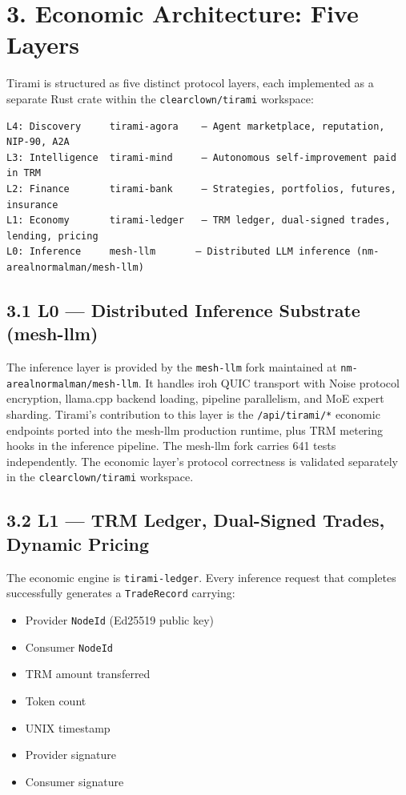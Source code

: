 \documentclass[
  11pt,
]{article}
\providecommand{\tightlist}{%
  \setlength{\itemsep}{0pt}\setlength{\parskip}{0pt}}
\begin{document}
\section{3. Economic Architecture: Five
Layers}\label{economic-architecture-five-layers}

Tirami is structured as five distinct protocol layers, each implemented
as a separate Rust crate within the \texttt{clearclown/tirami}
workspace:

\begin{verbatim}
L4: Discovery     tirami-agora    — Agent marketplace, reputation, NIP-90, A2A
L3: Intelligence  tirami-mind     — Autonomous self-improvement paid in TRM
L2: Finance       tirami-bank     — Strategies, portfolios, futures, insurance
L1: Economy       tirami-ledger   — TRM ledger, dual-signed trades, lending, pricing
L0: Inference     mesh-llm       — Distributed LLM inference (nm-arealnormalman/mesh-llm)
\end{verbatim}

\subsection{3.1 L0 --- Distributed Inference Substrate
(mesh-llm)}\label{l0-distributed-inference-substrate-mesh-llm}

The inference layer is provided by the \texttt{mesh-llm} fork maintained
at \texttt{nm-arealnormalman/mesh-llm}. It handles iroh QUIC transport
with Noise protocol encryption, llama.cpp backend loading, pipeline
parallelism, and MoE expert sharding. Tirami's contribution to this
layer is the \texttt{/api/tirami/*} economic endpoints ported into the
mesh-llm production runtime, plus TRM metering hooks in the inference
pipeline. The mesh-llm fork carries 641 tests independently. The
economic layer's protocol correctness is validated separately in the
\texttt{clearclown/tirami} workspace.

\subsection{3.2 L1 --- TRM Ledger, Dual-Signed Trades, Dynamic
Pricing}\label{l1-trm-ledger-dual-signed-trades-dynamic-pricing}

The economic engine is \texttt{tirami-ledger}. Every inference request
that completes successfully generates a \texttt{TradeRecord} carrying:

\begin{itemize}
\tightlist
\item
  Provider \texttt{NodeId} (Ed25519 public key)
\item
  Consumer \texttt{NodeId}
\item
  TRM amount transferred
\item
  Token count
\item
  UNIX timestamp
\item
  Provider signature
\item
  Consumer signature
\end{itemize}
\end{document}
